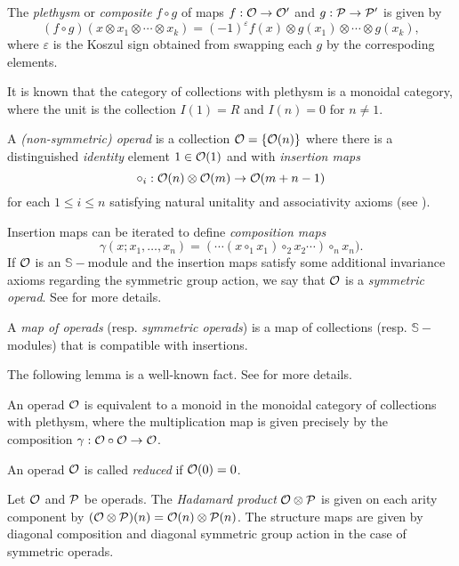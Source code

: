 \documentclass[Thesis.tex]{subfiles}
\begin{document}
\begin{defin}
The \emph{plethysm} or \emph{composite} $f\circ g$ of maps $f:{\mathcal O}\to{\mathcal O}'$ and $g:\mathcal{P}\to\mathcal{P}'$ is given by
\[(f\circ g)(x\otimes x_1\otimes\cdots\otimes x_k)=(-1)^{\varepsilon} f(x)\otimes g(x_1)\otimes\cdots\otimes g(x_k),\]
where $\varepsilon$ is the Koszul sign obtained from swapping each $g$ by the correspoding elements. 
\end{defin}


It is known that the category of collections with plethysm is a monoidal category, where the unit is the collection $I(1)=R$ and $I(n)=0$ for $n\neq 1$. 
\begin{defin}
A \emph{(non-symmetric) operad} is a collection ${\mathcal O}=\{{\mathcal O}(n)\}$ where there is a distinguished \emph{identity} element $1\in{\mathcal O}(1)$ and with \emph{insertion maps} 
\[\circ_i:{\mathcal O}(n)\otimes {\mathcal O}(m)\to {\mathcal O}(m+n-1)\]
for each $1\leq i\leq n$ satisfying natural unitality and associativity axioms (see \cite[\S 1.1.2]{ward}). 

Insertion maps can be iterated to define \emph{composition maps} \[\gamma(x;x_1,\dots, x_n)=(\cdots(x\circ_1 x_1)\circ_2 x_2\cdots
)\circ_n x_n).\]
If ${\mathcal O}$ is an $\mathbb{S}-$module and the insertion maps satisfy some additional invariance axioms regarding the symmetric group action, we say that ${\mathcal O}$ is a \emph{symmetric operad}. See \cite{lodayvallette} for more details.

A \emph{map of operads} (resp. \emph{symmetric operads}) is a map of collections (resp. $\mathbb{S}-$modules) that is compatible with insertions.
\end{defin}

The following lemma is a well-known fact. See \cite[\S 5]{lodayvallette} for more details. 
\begin{lem}\label{monoid}
An operad ${\mathcal O}$ is equivalent to a monoid in the monoidal category of collections with plethysm, where the multiplication  map is given precisely by the composition $\gamma:{\mathcal O}\circ{\mathcal O}\to{\mathcal O}$. 
\end{lem}


\begin{defin} An operad ${\mathcal O}$ is called \emph{reduced} if ${\mathcal O}(0)=0$.\end{defin}

\begin{defin} Let ${\mathcal O}$ and $\mathcal{P}$ be operads. The \emph{Hadamard product} ${\mathcal O}\otimes\mathcal{P}$ is given on each arity component by $({\mathcal O}\otimes\mathcal{P})(n)={\mathcal O}(n)\otimes\mathcal{P}(n)$. The structure maps are given by diagonal composition and diagonal symmetric group action in the case of symmetric operads. \end{defin}
\end{document}
